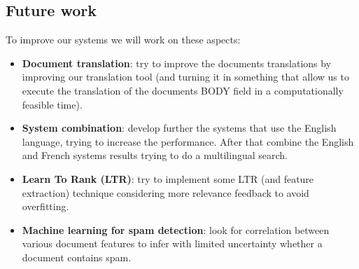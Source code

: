 \subsection{Future work}
\label{subsec:future}
To improve our systems we will work on these aspects:
\begin{itemize}
    \item \textbf{Document translation}: try to improve the documents translations by improving our translation tool (and turning it in something that allow us to execute the translation of the documents BODY field in a computationally feasible time).
    \item \textbf{System combination}: develop further the systems that use the English language, trying to increase the performance. After that combine the English and French systems results trying to do a multilingual search.
    \item \textbf{Learn To Rank (LTR)}: try to implement some LTR (and feature extraction) technique considering more relevance feedback to avoid overfitting.
    \item \textbf{Machine learning for spam detection}: look for correlation between various document features to infer with limited uncertainty whether a document contains spam.
\end{itemize}


